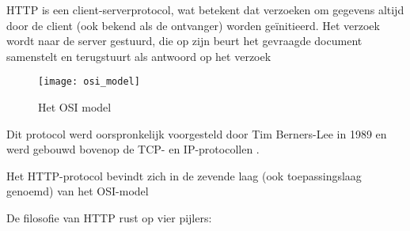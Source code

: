 HTTP is een client-serverprotocol, wat betekent dat verzoeken om gegevens altijd door de client (ook bekend als de ontvanger) worden geïnitieerd. Het verzoek wordt naar de server gestuurd, die op zijn beurt het gevraagde document samenstelt en terugstuurt als antwoord op het verzoek \autocite{MDN2023}

\begin{figure}[H]
    \texttt{[image: osi\_model]}
    \centering
    \caption{Het OSI model}
    \label{fig:osiModel}
\end{figure}

Dit protocol werd oorspronkelijk voorgesteld door Tim Berners-Lee in 1989 en werd gebouwd bovenop de TCP- en IP-protocollen \autocite{MDN2023a}.

Het HTTP-protocol bevindt zich in de zevende laag (ook toepassingslaag genoemd) van het OSI-model \autocite{MDN2023}

De filosofie van HTTP rust op vier pijlers:\\

